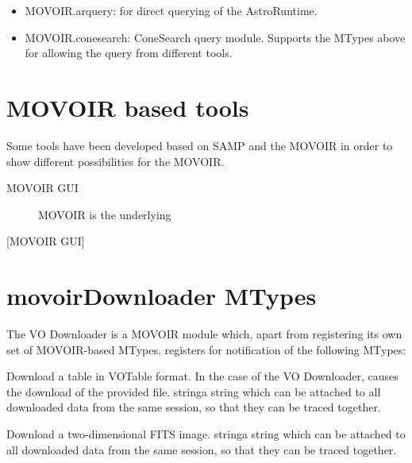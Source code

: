 		\begin{itemize}
			\item MOVOIR.arquery: for direct querying of the
			AstroRuntime.
			
			\item MOVOIR.conesearch: ConeSearch query module.
			Supports the MTypes above for allowing the query from
			different tools.
			
		\end{itemize}
	
	\section{MOVOIR based tools} %
	\label{sec:movoir_based_tools}
	
		Some tools have been developed based on SAMP and the
		MOVOIR in order to show different possibilities for
		the MOVOIR.
		
		\begin{description}
			\item[MOVOIR GUI] MOVOIR is the underlying 
		\end{description}
		[MOVOIR GUI]
	
	\section{movoirDownloader MTypes} %
	\label{sec:vodownloader_registered_mtypes}
	
		The VO Downloader is a MOVOIR module which, apart from 
		registering its own set of MOVOIR-based MTypes, registers
		for notification of the following MTypes:
		
				{Download a table in VOTable format. In the case of
				the VO Downloader, causes the download of the
				provided file.}
				{
				{string}{a string which can be attached to all
				downloaded data from the same session, so that they
				can be traced together.}
				}
				{\mtypeparamnone}
				
				{Download a two-dimensional FITS image.}
				{
				{string}{a string which can be attached to all
				downloaded data from the same session, so that they
				can be traced together.}
				}
				{\mtypeparamnone}
				

